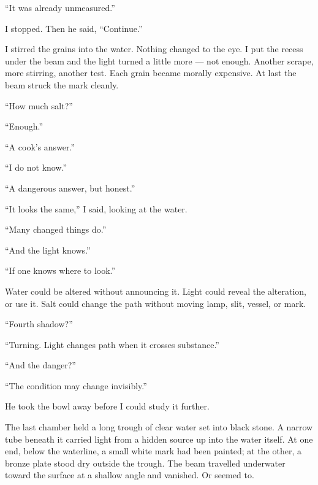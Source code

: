 ``It was already unmeasured.''\par

I stopped. Then he said, ``Continue.''\par

I stirred the grains into the water. Nothing changed to the eye. I put the recess under the beam and the light turned a little more --- not enough. Another scrape, more stirring, another test. Each grain became morally expensive. At last the beam struck the mark cleanly.\par

``How much salt?''\par

``Enough.''\par

``A cook's answer.''\par

``I do not know.''\par

``A dangerous answer, but honest.''\par

``It looks the same,'' I said, looking at the water.\par

``Many changed things do.''\par

``And the light knows.''\par

``If one knows where to look.''\par

Water could be altered without announcing it. Light could reveal the alteration, or use it. Salt could change the path without moving lamp, slit, vessel, or mark.\par

``Fourth shadow?''\par

``Turning. Light changes path when it crosses substance.''\par

``And the danger?''\par

``The condition may change invisibly.''\par

He took the bowl away before I could study it further.\par

\ornament

The last chamber held a long trough of clear water set into black stone. A narrow tube beneath it carried light from a hidden source up into the water itself. At one end, below the waterline, a small white mark had been painted; at the other, a bronze plate stood dry outside the trough. The beam travelled underwater toward the surface at a shallow angle and vanished. Or seemed to.\par

